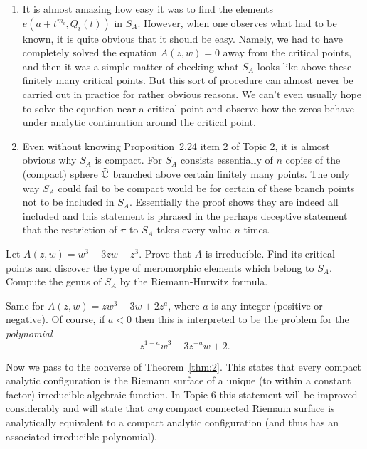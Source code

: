 \documentclass[a4paper,11pt]{article}
\begin{document}
\begin{rem}
\begin{enumerate}
  \item It is almost amazing how easy it was to find the elements $e(a
    + t^{m_i}, Q_i(t))$ in $S_A$.  However, when one observes what had
    to be known, it is quite obvious that it should be easy.  Namely,
    we had to have completely solved the equation $A(z,w) = 0$ away
    from the critical points, and then it was a simple matter of
    checking what $S_A$ looks like above these finitely many critical
    points.  But this sort of procedure can almost never be carried
    out in practice for rather obvious reasons.  We can't even usually
    hope to solve the equation near a critical point and observe how
    the zeros behave under analytic continuation around the critical
    point.

  \item Even without knowing Proposition~2.24 item 2 of Topic 2, it is
    almost obvious why $S_A$ is compact.  For $S_A$ consists
    essentially of $n$ copies of the (compact) sphere $\widehat{{\mathbb C}}$
    branched above certain finitely many points.  The only way $S_A$
    could fail to be compact would be for certain of these branch
    points not to be included in $S_A$.  Essentially the proof shows
    they are indeed all included and this statement is phrased in the
    perhaps deceptive statement that the restriction of $\pi$ to $S_A$
    takes every value $n$ times.
  \end{enumerate}
\end{rem}

\begin{ques}
  \label{ques:6}
  Let $A(z,w) = w^3 - 3zw + z^3$.  Prove that $A$ is irreducible.
  Find its critical points and discover the type of meromorphic
  elements which belong to $S_A$.  Compute the genus of $S_A$ by the
  Riemann-Hurwitz formula.
\end{ques}

\begin{ques}
  \label{ques:7}
  Same for $A(z,w) = zw^3 - 3w + 2z^a$, where $a$ is any integer
  (positive or negative).  Of course, if $a < 0$ then this is
  interpreted to be the problem for the \emph{polynomial}
  $$
  z^{1-a} w^3 - 3z^{-a} w + 2.
  $$
\end{ques}

Now we pass to the converse of Theorem~\ref{thm:2}.  This states that
every compact analytic configuration is the Riemann surface of a
unique (to within a constant factor) irreducible algebraic function.
In Topic 6 this statement will be improved considerably and will state
that \emph{any} compact connected Riemann surface is analytically
equivalent to a compact analytic configuration (and thus has an
associated irreducible polynomial).
\end{document}
